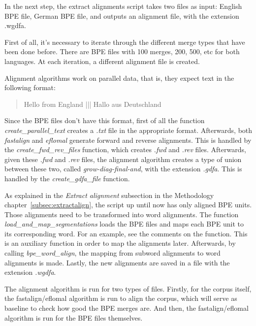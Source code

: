In the next step, the extract alignments script takes two files as input: English BPE file, German BPE file, and outputs an alignment file, with the extension .wgdfa.

First of all, it's necessary to iterate through the different merge types that have been done before. There are BPE files with 100 merges, 200, 500, etc for both languages. At each iteration, a different alignment file is created.

Alignment algorithms work on parallel data, that is, they expect text in the following format:

\begin{quote}
  Hello from England ||| Hallo aus Deutschland
\end{quote}

Since the BPE files don't have this format, first of all the function \emph{create\_parallel\_text} creates a \emph{.txt} file in the appropriate format. Afterwards, both \emph{fastalign} and \emph{eflomal} generate forward and reverse alignments. This is handled by the \emph{create\_fwd\_rev\_files} function, which creates \emph{.fwd} and \emph{.rev} files. Afterwards, given these \emph{.fwd} and \emph{.rev} files, the alignment algorithm creates a type of union between these two, called \emph{grow-diag-final-and}, with the extension \emph{.gdfa}. This is handled by the \emph{create\_gdfa\_file} function.

As explained in the \textit{Extract alignment} subsection in the Methodology chapter~\ref{subsec:extractalign}, the script up until now has only aligned BPE units. Those alignments need to be transformed into word alignments. The function \emph{load\_and\_map\_segmentations} loads the BPE files and maps each BPE unit to its corresponding word. For an example, see the comments on the function. This is an auxiliary function in order to map the alignments later. Afterwards, by calling \emph{bpe\_word\_align}, the mapping from subword alignments to word alignments is made. Lastly, the new alignments are saved in a file with the extension \emph{.wgdfa}.

The alignment algorithm is run for two types of files. Firstly, for the corpus itself, the fastalign/eflomal algorithm is run to align the corpus, which will serve as baseline to check how good the BPE merges are. And then, the fastalign/eflomal algorithm is run for the BPE files themselves.

